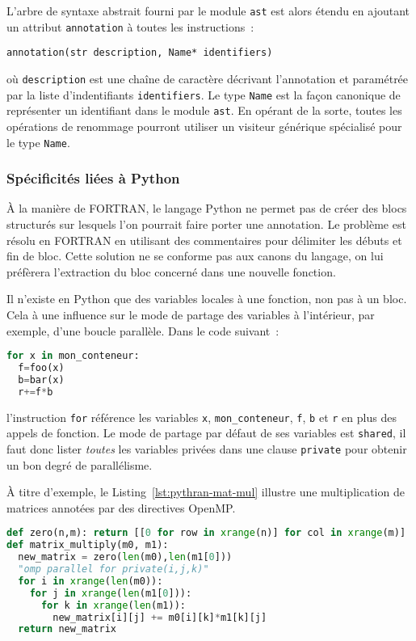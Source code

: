 \documentclass[renpar]{compas2013}
\begin{document}
L'arbre de syntaxe abstrait fourni par le module \texttt{ast} est alors
étendu en ajoutant un attribut \texttt{annotation} à toutes les
instructions~:

\begin{lstlisting}
annotation(str description, Name* identifiers)
\end{lstlisting}

\noindent où \texttt{description} est une chaîne de caractère décrivant
l'annotation et paramétrée par la liste d'indentifiants
\texttt{identifiers}. Le type \texttt{Name} est la façon canonique de
représenter un identifiant dans le module \texttt{ast}.  En opérant de la
sorte, toutes les opérations de renommage pourront utiliser un visiteur
générique spécialisé pour le type \texttt{Name}.

\subsubsection{Spécificités liées à Python}

À la manière de FORTRAN, le langage Python ne permet pas de créer des
blocs structurés sur lesquels l'on pourrait faire porter une annotation.
Le problème est résolu en FORTRAN en utilisant des commentaires pour
délimiter les débuts et fin de bloc. Cette solution ne se conforme pas aux
canons du langage, on lui préfèrera l'extraction du bloc concerné dans une
nouvelle fonction.

Il n'existe en Python que des variables locales à une fonction, non pas à
un bloc. Cela à une influence sur le mode de partage des variables à
l'intérieur, par exemple, d'une boucle parallèle. Dans le code suivant~:

\begin{lstlisting}[language=python]
for x in mon_conteneur:
  f=foo(x)
  b=bar(x)
  r+=f*b
\end{lstlisting}

\noindent l'instruction \texttt{for} référence les variables \texttt{x},
\texttt{mon\_conteneur}, \texttt{f}, \texttt{b} et \texttt{r} en plus des
appels de fonction. Le mode de partage par défaut de ses variables est
\texttt{shared}, il faut donc lister \emph{toutes} les variables privées
dans une clause \texttt{private} pour obtenir un bon degré de parallélisme.

À titre d'exemple, le Listing~\ref{lst:pythran-mat-mul} illustre une
multiplication de matrices annotées par des directives OpenMP.

\begin{lstlisting}[language=python, label={lst:pythran-mat-mul},caption={multiplication de matrice avec
  annotations OpenMP}]
def zero(n,m): return [[0 for row in xrange(n)] for col in xrange(m)]
def matrix_multiply(m0, m1):
  new_matrix = zero(len(m0),len(m1[0]))
  "omp parallel for private(i,j,k)"
  for i in xrange(len(m0)):
    for j in xrange(len(m1[0])):
      for k in xrange(len(m1)):
        new_matrix[i][j] += m0[i][k]*m1[k][j]
  return new_matrix
\end{lstlisting}
\end{document}
